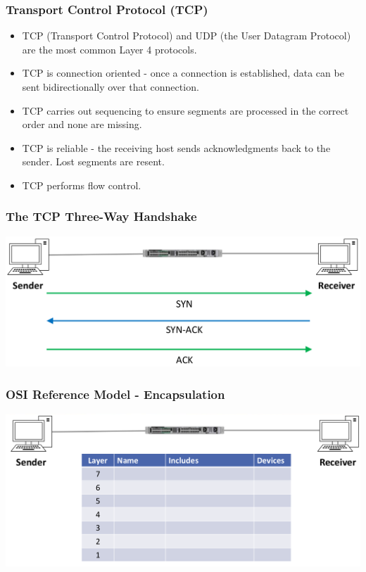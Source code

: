 \documentclass[pdflatex,compress]{beamer}
\begin{document}
\begin{frame}
	\frametitle{Transport Control Protocol (TCP)}
	\begin{itemize}
		\item TCP (Transport Control Protocol) and UDP (the User Datagram Protocol) are the most common Layer 4 protocols.
		\item TCP is connection oriented - once a connection is established, data can be sent bidirectionally over that connection.
		\item TCP carries out sequencing to ensure segments are processed in the correct order and none are missing.
		\item TCP is reliable - the receiving host sends acknowledgments back to the sender. Lost segments are resent.
		\item TCP performs flow control.
	\end{itemize}
\end{frame}

\begin{frame}
	\frametitle{The TCP Three-Way Handshake}
	\begin{center}
		\includegraphics[width=\linewidth]{img/img03}
	\end{center}
\end{frame}

\begin{frame}
	\frametitle{OSI Reference Model - Encapsulation}
	\begin{center}
		\includegraphics[width=\linewidth]{img/img04}
	\end{center}
\end{frame}
\end{document}
